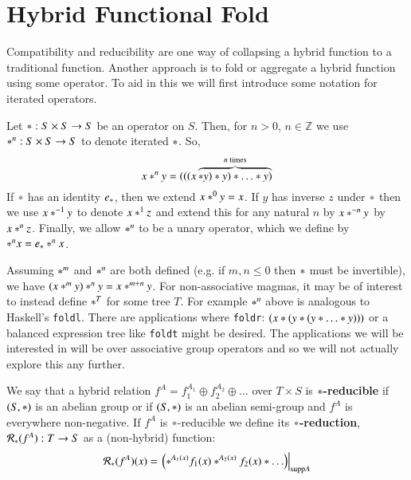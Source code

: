 \section{Hybrid Functional Fold}


Compatibility and reducibility are one way of collapsing a hybrid function to a traditional function.
Another approach is to fold or aggregate a hybrid function using some operator.
To aid in this we will first introduce some notation for iterated operators.
\begin{definition}
	Let $* : S \times S \to S$ be an operator on $S$.
	Then, for $n > 0$, $n \in \mathbb{Z}$ we use $*^n:S \times S \to S$ to denote iterated $*$.
	So,
	\begin{equation}
		x *^n y = (((x \overbrace{* y) * y) * \ldots * y)}^{n \text{ times}}
	\end{equation}
	If $*$ has an identity $e_*$, then we extend $x *^0 y = x$.
	If $y$ has inverse $z$ under $*$ then we use $x *^{-1} y$ to denote $x *^1 z$
	and extend this for any natural $n$ by $x *^{-n} y$ by  $x *^{n} z$.
	Finally, we allow $*^n$ to be a unary operator, which we define by $*^n x = e_* *^n x$.
\end{definition}

Assuming $*^m$ and $*^n$ are both defined (e.g. if $m,n \leq 0$ then $*$ must be invertible),
we have $ ( x *^m y ) *^n y = x *^{m+n} y$.
For non-associative magmas, it may be of interest to instead define $*^T$ for some tree $T$. 
For example $*^n$ above is analogous to Haskell's \texttt{foldl}.
There are applications where \texttt{foldr}: $(x * ( y * ( y * \ldots * y)))$ or a balanced expression tree like \texttt{foldt} might be desired.
The applications we will be interested in will be over associative group operators and so we will not actually 
explore this any further.

\begin{definition}
	We say that a hybrid relation $f^A = f_1^{A_1} \oplus f_2^{A_2} \oplus \ldots$ over $T \times S$ 
	is $*$\textbf{-reducible} if $(S, *)$ is an abelian group 
	or if $(S, *)$ is an abelian semi-group and $f^A$ is everywhere non-negative.
	If $f^A$ is $*$-reducible we define its $*$\textbf{-reduction}, $\mathcal{R}_*(f^A) :  T \to S$ 
	as a (non-hybrid) function:
	\begin{equation}
		\mathcal{R}_* (f^A)(x) = \left.\left(*^{A_1(x)} f_1(x) *^{A_2(x)} f_2(x) * \ldots \right)\right|_{\text{supp} A}
	\end{equation}
\end{definition}


